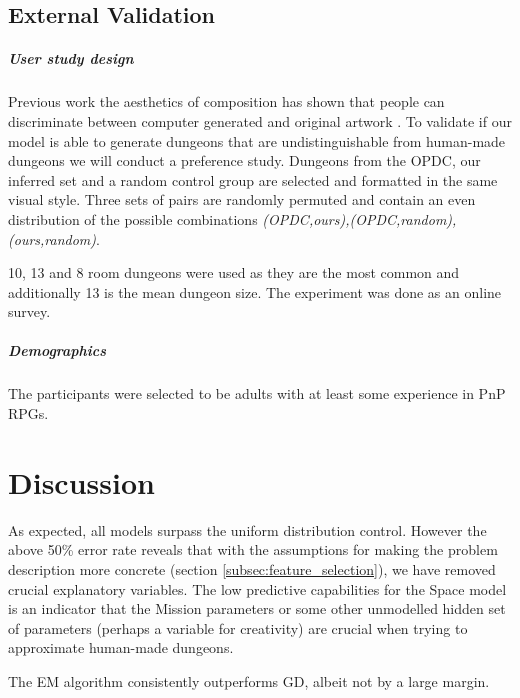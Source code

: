 \documentclass{UoYCSproject}
\begin{document}
\section{External Validation} %
\paragraph{User study design}
Previous work the aesthetics of composition has shown that people can discriminate between computer generated and original artwork \parencite{McManusMondrian} \parencite{FurnhamMondrian}. To validate if our model is able to generate dungeons that are undistinguishable from human-made dungeons we will conduct a preference study. Dungeons from the OPDC, our inferred set and a random control group are selected and formatted in the same visual style. Three sets of pairs are randomly permuted and contain an even distribution of the possible combinations \textit{(OPDC,ours),(OPDC,random),(ours,random)}.

10, 13 and 8 room dungeons were used as they are the most common and additionally 13 is the mean dungeon size.
The experiment was done as an online survey.

\paragraph{Demographics}
The participants were selected to be adults with at least some experience in PnP RPGs. 


\chapter{Discussion}
As expected, all models surpass the uniform distribution control. However the above 50\% error rate reveals that with the assumptions for making the problem description more concrete (section \ref{subsec:feature_selection}), we have removed crucial explanatory variables. The low predictive capabilities for the Space model is an indicator that the Mission parameters or some other unmodelled hidden set of parameters (perhaps a variable for creativity) are crucial when trying to approximate human-made dungeons. 


The EM algorithm consistently outperforms GD, albeit not by a large margin. 
\end{document}

